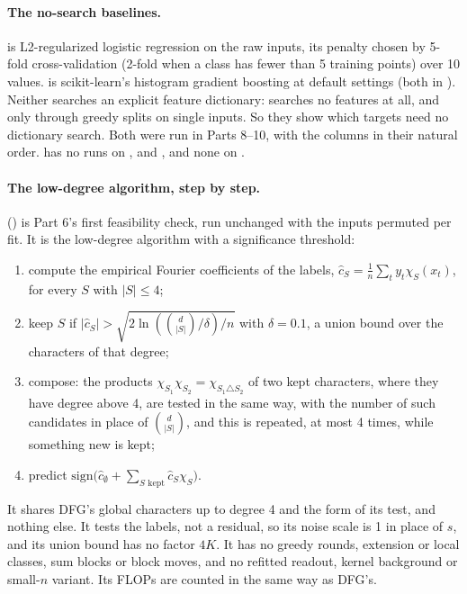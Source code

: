 \paragraph{The no-search baselines.}  is L2-regularized logistic regression on the raw inputs, its penalty chosen by 5-fold cross-validation (2-fold when a class has fewer than 5 training points) over 10 values.  is scikit-learn's histogram gradient boosting at default settings \cite{pedregosa2011sklearn} (both in ). Neither searches an explicit feature dictionary:  searches no features at all, and  only through greedy splits on single inputs. So they show which targets need no dictionary search. Both were run in Parts 8--10, with the columns in their natural order.  has no runs on ,  and , and  none on .

\paragraph{The low-degree algorithm, step by step.}  () is Part 6's first feasibility check, run unchanged with the inputs permuted per fit. It is the low-degree algorithm \cite{linial1993constant} with a significance threshold:
\begin{enumerate}
\item compute the empirical Fourier coefficients of the labels, $\hat c_S=\frac1n\sum_ty_t\chi_S(x_t)$, for every $S$ with $|S|\le4$;
\item keep $S$ if $|\hat c_S|>\sqrt{2\ln(\binom d{|S|}/\delta)/n}$ with $\delta=0.1$, a union bound over the characters of that degree;
\item compose: the products $\chi_{S_1}\chi_{S_2}=\chi_{S_1\triangle S_2}$ of two kept characters, where they have degree above 4, are tested in the same way, with the number of such candidates in place of $\binom d{|S|}$, and this is repeated, at most 4 times, while something new is kept;
\item predict $\mathrm{sign}\bigl(\hat c_\emptyset+\sum_{S\text{ kept}}\hat c_S\chi_S\bigr)$.
\end{enumerate}
It shares DFG's global characters up to degree 4 and the form of its test, and nothing else. It tests the labels, not a residual, so its noise scale is 1 in place of $s$, and its union bound has no factor $4K$. It has no greedy rounds, extension or local classes, sum blocks or block moves, and no refitted readout, kernel background or small-$n$ variant. Its FLOPs are counted in the same way as DFG's.

